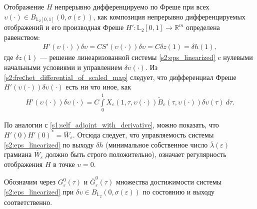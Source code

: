 \documentclass[../main.tex]{subfiles}
\begin{document}
Отображение $ H $ непрерывно дифференцируемо по Фреше при всех $ \upsilon(\cdot) \in  B_{\mathbb{L}_2[0,1]}(0,\sigma(\varepsilon)) $, как композиция непрерывно дифференцируемых отображений и его производная Фреше $ H': \mathbb{L}_2[0,1]  \rightarrow  \mathbb{R}^m $ определена равенством:
\begin{gather*}
	H'( \upsilon(\cdot))\delta \upsilon =  C S'(\upsilon(\cdot))\delta  \upsilon = C \delta z(1) = \delta h(1),
\end{gather*}
где $ \delta z(1) $ --- решение линеаризованной системы \eqref{s2:eps_linearized} c нулевыми начальными условиями и управлением $  \delta  \upsilon(\cdot) $. 
 Из \eqref{s2:freсhet_differential_of_scaled_map} следует, что дифференциал Фреше $ H'(\upsilon(\cdot)) \delta \upsilon(\cdot) $ есть ни что иное, как
\begin{gather*}
	H'(\upsilon(\cdot)) \delta \upsilon(\cdot) = C \int\limits_0^1 X_{\varepsilon}(1,\tau, \upsilon(\cdot)) \widetilde{B}_{\varepsilon} (\tau, \upsilon(\cdot)) \delta \upsilon(\tau) \ d \tau.
\end{gather*}

По аналогии с \eqref{s1:self_adjoint_with_derivative}, можно показать, что $ H'(0) H'(0)^* = \overline{W}_{\varepsilon}$. 
Отсюда следует, что управляемость системы \eqref{s2:eps_linearized} по выходу $\delta h$ (минимальное собственное число $\overline{\lambda}(\varepsilon)$ грамиана $ \overline{W}_{\varepsilon}$ должно быть строго положительно), означает регулярность отображения $H$ в точке $\upsilon = 0$.

Обозначим через $G^0_{\varepsilon}(\tau)$ и $\overline{G}^0_{\varepsilon}(\tau)$ множества достижимости системы \eqref{s2:eps_linearized} при $\delta \upsilon \in B_{\mathbb{L}_2}(0, \sigma(\varepsilon))$ по состоянию и выходу соответственно.
\end{document}
